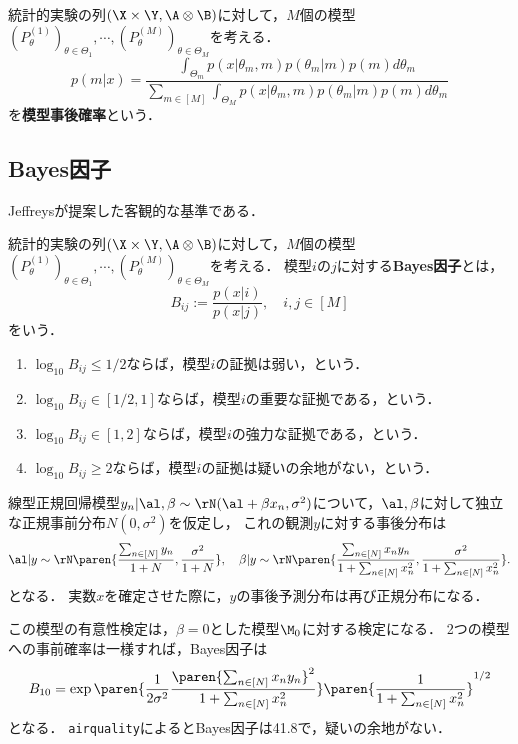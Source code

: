 \documentclass[uplatex,dvipdfmx]{jsreport}
\begin{document}
\begin{definition}
    統計的実験の列$(\X\times\Y,\A\otimes\B)$に対して，$M$個の模型$(P^{(1)}_\theta)_{\theta\in\Theta_1},\cdots,(P^{(M)}_\theta)_{\theta\in\Theta_M}$を考える．
    \[p(m|x)=\frac{\int_{\Theta_m}p(x|\theta_m,m)p(\theta_m|m)p(m)d\theta_m}{\sum_{m\in[M]}\int_{\Theta_M}p(x|\theta_m,m)p(\theta_m|m)p(m)d\theta_m}\]
    を\textbf{模型事後確率}という．
\end{definition}

\subsection{Bayes因子}

\begin{tcolorbox}[colframe=ForestGreen, colback=ForestGreen!10!white,breakable,colbacktitle=ForestGreen!40!white,coltitle=black,fonttitle=\bfseries\sffamily,
title=]
    Jeffreysが提案した客観的な基準である．
\end{tcolorbox}

\begin{definition}
    統計的実験の列$(\X\times\Y,\A\otimes\B)$に対して，$M$個の模型$(P^{(1)}_\theta)_{\theta\in\Theta_1},\cdots,(P^{(M)}_\theta)_{\theta\in\Theta_M}$を考える．
    模型$i$の$j$に対する\textbf{Bayes因子}とは，
    \[B_{ij}:=\frac{p(x|i)}{p(x|j)},\quad i,j\in[M]\]
    をいう．
    \begin{enumerate}
        \item $\log_{10}B_{ij}\le1/2$ならば，模型$i$の証拠は弱い，という．
        \item $\log_{10}B_{ij}\in[1/2,1]$ならば，模型$i$の重要な証拠である，という．
        \item $\log_{10}B_{ij}\in[1,2]$ならば，模型$i$の強力な証拠である，という．
        \item $\log_{10}B_{ij}\ge2$ならば，模型$i$の証拠は疑いの余地がない，という．
    \end{enumerate}
\end{definition}

\begin{example}
    線型正規回帰模型$y_n|\al,\beta\sim\rN(\al+\beta x_n,\sigma^2)$について，$\al,\beta$に対して独立な正規事前分布$N(0,\sigma^2)$を仮定し，
    これの観測$y$に対する事後分布は
    \[\al|y\sim\rN\paren{\frac{\sum_{n\in[N]}y_n}{1+N},\frac{\sigma^2}{1+N}},\quad\beta|y\sim\rN\paren{\frac{\sum_{n\in[N]}x_ny_n}{1+\sum_{n\in[N]}x_n^2},\frac{\sigma^2}{1+\sum_{n\in[N]}x_n^2}}.\]
    となる．
    実数$x$を確定させた際に，$y$の事後予測分布は再び正規分布になる．

    この模型の有意性検定は，$\beta=0$とした模型$\M_0$に対する検定になる．
    2つの模型への事前確率は一様すれば，Bayes因子は
    \[B_{10}=\exp\paren{\frac{1}{2\sigma^2}\frac{\paren{\sum_{n\in[N]}x_ny_n}^2}{1+\sum_{n\in[N]}x_n^2}}\paren{\frac{1}{1+\sum_{n\in[N]}x_n^2}}^{1/2}\]
    となる．
    \texttt{airquality}によるとBayes因子は41.8で，疑いの余地がない．
\end{example}
\end{document}
